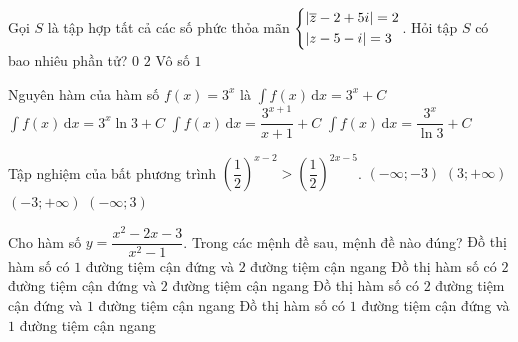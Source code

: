 \begin{ex}%
Gọi $S$ là tập hợp tất cả các số phức thỏa mãn $\left\{\begin{aligned}&|\overline{z}-2+5i|=2\\ &|z-5-i|=3\end{aligned}\right.$. Hỏi tập $S$ có bao nhiêu phần tử?
\choice
{$0$}
{$2$}
{Vô số}
{\True $1$}
\end{ex}

\begin{ex}%
Nguyên hàm của hàm số $f(x)=3^x$ là
\choice
{$\displaystyle\int f(x)\mathrm{\,d}x=3^x+C$}
{$\displaystyle\int f(x)\mathrm{\,d}x=3^x\ln 3+C$}
{$\displaystyle\int f(x)\mathrm{\,d}x=\dfrac{3^{x+1}}{x+1}+C$}
{\True $\displaystyle\int f(x)\mathrm{\,d}x=\dfrac{3^x}{\ln 3}+C$}
\end{ex}

\begin{ex}%
Tập nghiệm của bất phương trình $\left(\dfrac{1}{2}\right)^{x-2}>\left(\dfrac{1}{2}\right)^{2x-5}$.
\choice
{$(-\infty;-3)$}
{\True $(3;+\infty)$}
{$(-3;+\infty)$}
{$(-\infty;3)$}
\end{ex}

\begin{ex}%
Cho hàm số $y=\dfrac{x^2-2x-3}{x^2-1}$. Trong các mệnh đề sau, mệnh đề nào đúng?
\choice
{Đồ thị hàm số có $1$ đường tiệm cận đứng và $2$ đường tiệm cận ngang}
{Đồ thị hàm số có $2$ đường tiệm cận đứng và $2$ đường tiệm cận ngang}
{Đồ thị hàm số có $2$ đường tiệm cận đứng và $1$ đường tiệm cận ngang}
{\True Đồ thị hàm số có $1$ đường tiệm cận đứng và $1$ đường tiệm cận ngang}
\end{ex}

